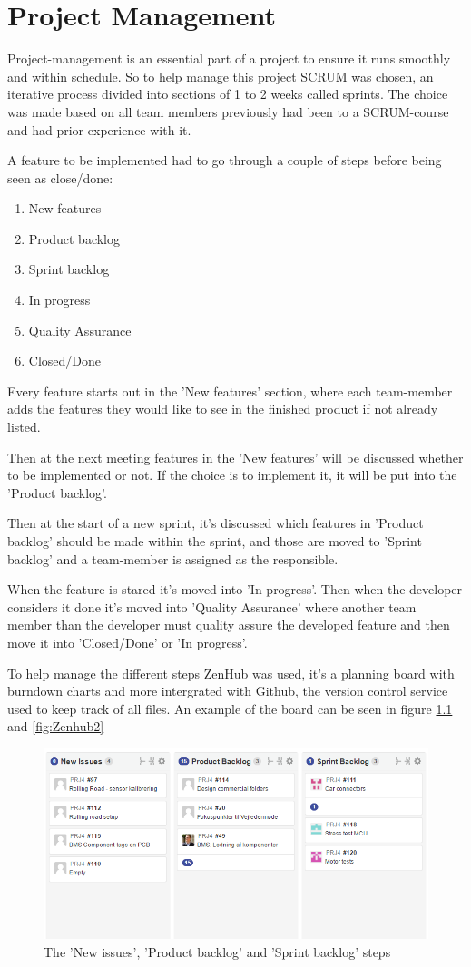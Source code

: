 \chapter{Project Management}

Project-management is an essential part of a project to ensure it runs smoothly and within schedule. So to help manage this project SCRUM was chosen, an iterative process divided into sections of 1 to 2 weeks called sprints.
The choice was made based on all team members previously had been to a SCRUM-course and had prior experience with it.

A feature to be implemented had to go through a couple of steps before being seen as close/done:

\begin{enumerate}
	\item New features
	\item Product backlog
	\item Sprint backlog
	\item In progress
	\item Quality Assurance
	\item Closed/Done
\end{enumerate}

Every feature starts out in the 'New features' section, where each team-member adds the features they would like to see in the finished product if not already listed.

Then at the next meeting features in the 'New features' will be discussed whether to be implemented or not. If the choice is to implement it, it will be put into the 'Product backlog'.

Then at the start of a new sprint, it's discussed which features in 'Product backlog' should be made within the sprint, and those are moved to 'Sprint backlog' and a team-member is assigned as the responsible.

When the feature is stared it's moved into 'In progress'. Then when the developer considers it done it's moved into 'Quality Assurance' where another team member than the developer must quality assure the developed feature and then move it into 'Closed/Done' or 'In progress'.

To help manage the different steps ZenHub was used, it's a planning board with burndown charts and more intergrated with Github, the version control service used to keep track of all files. An example of the board can be seen in figure \ref{fig:Zenhub1} and \vref{fig:Zenhub2}

\begin{figure}
	\centering
	\includegraphics[width=0.7\linewidth]{SubPages/Images/Zenhub1}
	\caption{The 'New issues', 'Product backlog' and 'Sprint backlog' steps}
	\label{fig:Zenhub1}
\end{figure}


